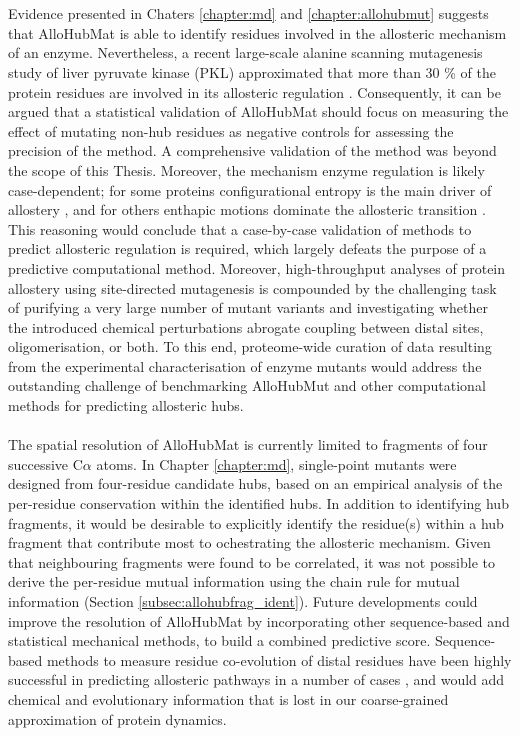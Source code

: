 %
%
\\\\
%
%
Evidence presented in Chaters \ref{chapter:md} and \ref{chapter:allohubmut} suggests that AlloHubMat is able to identify residues involved in the allosteric mechanism of an enzyme. Nevertheless, a recent large-scale alanine scanning mutagenesis study of liver pyruvate kinase (PKL) approximated that more than 30 \% of the protein residues are involved in its allosteric regulation \cite{Tang:2017aa}. Consequently, it can be argued that a statistical validation of AlloHubMat should focus on measuring the effect of mutating non-hub residues as negative controls for assessing the precision of the method. A comprehensive validation of the method was beyond the scope of this Thesis. Moreover, the mechanism enzyme regulation is likely case-dependent; for some proteins configurational entropy is the main driver of allostery \cite{Capdevila:2017aa,Cooper:1984aa,Popovych:2006aa,Saavedra:2018aa,Tzeng:2012aa}, and for others enthapic motions dominate the allosteric transition \cite{Freiburger:2014aa,Hewitt:2016aa,Pacholarz:2017aa,Rosenzweig:2014aa,Volkman:2001aa,Webb:2015aa}. This reasoning would conclude that a case-by-case validation of methods to predict allosteric regulation is required, which largely defeats the purpose of a predictive computational method. Moreover, high-throughput analyses of protein allostery using site-directed mutagenesis is compounded by the challenging task of purifying a very large number of mutant variants and investigating whether the introduced chemical perturbations abrogate coupling between distal sites, oligomerisation, or both. To this end, proteome-wide curation of data resulting from the experimental characterisation of enzyme mutants would address the outstanding challenge of benchmarking AlloHubMut and other computational methods for predicting allosteric hubs. 
%
%
\\\\
%
%
The spatial resolution of AlloHubMat is currently limited to fragments of four successive C$\alpha$ atoms. In Chapter \ref{chapter:md}, single-point mutants were designed from four-residue candidate hubs, based on an empirical analysis of the per-residue conservation within the identified hubs. In addition to identifying hub fragments, it would be desirable to explicitly identify the residue(s) within a hub fragment that contribute most to ochestrating the allosteric mechanism. Given that neighbouring fragments were found to be correlated, it was not possible to derive the per-residue mutual information using the chain rule for mutual information (Section \ref{subsec:allohubfrag_ident}). Future developments could improve the resolution of AlloHubMat by incorporating other sequence-based \cite{Lockless:1999aa,Tesileanu:2015aa} and statistical mechanical \cite{Guarnera:2016aa,Guarnera:2017aa,Tee:2018aa} methods, to build a combined predictive score. Sequence-based methods to measure residue co-evolution of distal residues \cite{Juan:2013aa} have been highly successful in predicting allosteric pathways in a number of cases \cite{McLaughlin:2012aa,Reynolds:2011aa}, and would add chemical and evolutionary information that is lost in our coarse-grained approximation of protein dynamics.

